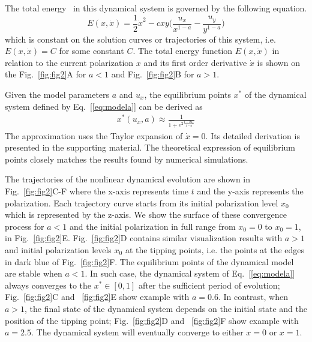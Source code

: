 The total energy~\cite{perko2013differential} in this dynamical system is governed by the following equation.
\begin{equation} \label{eq:energy}
    E(x, \dot{x}) = \frac{1}{2} \dot{x}^2 - c x y \Big( \frac{u_x}{x^{1-a}} - \frac{u_y}{y^{1-a}} \Big)
\end{equation}
which is constant on the solution curves or trajectories of this system, i.e. $E(x, \dot{x}) = C$ for some constant $C$. The total energy function $E(x, \dot{x})$ in relation to the current polarization $x$ and its first order derivative $\dot{x}$ is shown on the Fig.~\ref{fig:fig2}A for $a < 1$ and Fig.~\ref{fig:fig2}B for $a > 1$.

Given the model parameters $a$ and $u_x$, the equilibrium points $x^*$ of the dynamical system defined by Eq.~[\ref{eq:modela}] can be derived as
\begin{align} \label{eq:stable_states}
    x^*(u_x,a) \approx \frac{1}{1+e^{2 \frac{1 - 2u_x}{1 - a}}}
\end{align}
The approximation uses the Taylor expansion of $\dot{x} = 0$. Its detailed derivation is presented in the supporting material. The theoretical expression of equilibrium points closely matches the results found by numerical simulations.

The trajectories of the nonlinear dynamical evolution are shown in Fig.~\ref{fig:fig2}C-F where the x-axis represents time $t$ and the y-axis represents the polarization. Each trajectory curve starts from its initial polarization level $x_0$ which is represented by the z-axis. We show the surface of these convergence process for $a < 1$ and the initial polarization in full range from $x_0 = 0$ to $x_0 = 1$, in Fig.~\ref{fig:fig2}E. Fig.~\ref{fig:fig2}D contains similar visualization results with $a > 1$ and initial polarization levels $x_0$ at the tipping points, i.e. the points at the edges in dark blue of Fig.~\ref{fig:fig2}F. The equilibrium points of the dynamical model are stable when $a<1$. In such case, the dynamical system of Eq.~[\ref{eq:modela}] always converges to the $x^*\in[0,1]$ after the sufficient period of evolution; Fig.~\ref{fig:fig2}C and ~\ref{fig:fig2}E show example with $a=0.6$. In contrast, when $a>1$, the final state of the dynamical system depends on the initial state and the position of the tipping point; Fig.~\ref{fig:fig2}D and ~\ref{fig:fig2}F show example with $a=2.5$. The dynamical system will eventually converge to either $x=0$ or $x=1$.

